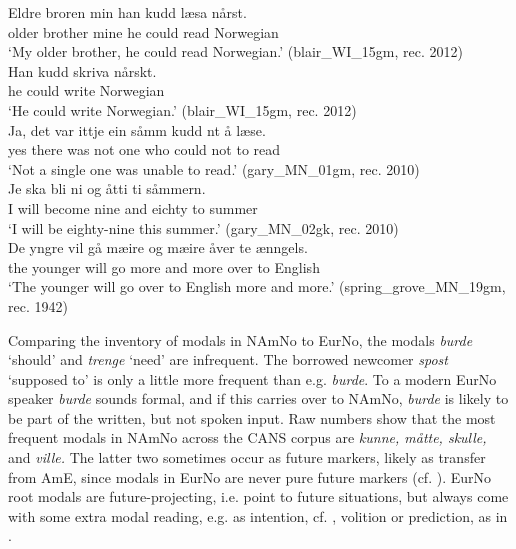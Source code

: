 \documentclass[output=paper]{langscibook}
\begin{document}
\ea\label{ex:eide:15}
	\ea \label{ex:eide:15a} 
	\gll Eldre broren min han kudd læsa nårst.    \\
	     older brother mine he could read Norwegian  \\
	\glt ‘My older brother, he could read Norwegian.’ (blair\_WI\_15gm, rec. 2012)\\
	\ex \label{ex:eide:15b}   
	\gll  Han kudd skriva nårskt.        \\
	      he could write Norwegian      \\
	\glt ‘He could write Norwegian.’ (blair\_WI\_15gm, rec. 2012) \\  
	\ex \label{ex:eide:15c} 
	\gll   Ja, det var ittje ein såmm kudd nt å læse.  \\
	       yes there was not one who could not to read  \\
	\glt  ‘Not a single one was unable to read.’ (gary\_MN\_01gm, rec. 2010)\\
	\ex \label{ex:eide:15d} 
	\gll Je ska bli ni og åtti ti såmmern.       \\
	     I will become nine and eichty to summer  \\
	\glt ‘I will be eighty-nine this summer.’ ({{gary\_MN\_02gk}}, rec. 2010)\\
	\ex \label{ex:eide:15e} 
	\gll De yngre vil gå mæire og mæire åver te ænngels.     \\
	     the younger will go more and more over to English  \\
	\glt ‘The younger will go over to English more and more.’ (spring\_grove\_MN\_19gm, rec. 1942)\\
	\z
\z  
      

Comparing the inventory of modals in NAmNo to EurNo, the modals \textit{burde} ‘should’ and \textit{trenge} ‘need’ are infrequent. The borrowed newcomer \textit{spost} ‘supposed to’ is only a little more frequent than e.g. \textit{burde}. To a modern EurNo speaker \textit{burde} sounds formal, and if this carries over to NAmNo, \textit{burde} is likely to be part of the written, but not spoken input. Raw numbers show that the most frequent modals in NAmNo across the CANS corpus are \textit{kunne, måtte, skulle,} and \textit{ville.} The latter two sometimes occur as future markers, likely as transfer from AmE, since modals in EurNo are never pure future markers (cf. ). EurNo root modals are future-projecting, i.e. point to future situations, but always come with some extra modal reading, e.g. as intention, cf. , volition or prediction, as in .
\end{document}
